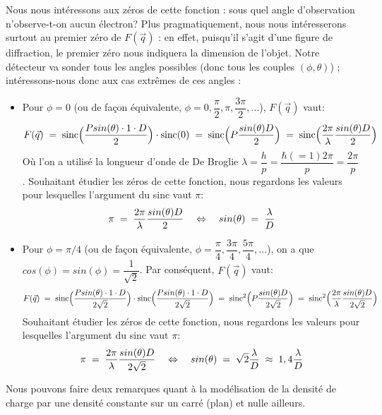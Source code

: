 Nous nous intéressons aux zéros de cette fonction : sous quel angle d'observation n'observe-t-on aucun électron? Plus pragmatiquement, nous nous intéresserons surtout au premier zéro de $F(\vec{q})$ : en effet, puisqu'il s'agit d'une figure de diffraction, le premier zéro nous indiquera la dimension de l'objet. Notre détecteur va sonder tous les angles possibles (donc tous les couples $(\phi,\theta)$) ; intéressons-nous donc aux cas extrêmes de ces angles : 
\begin{itemize}[label=$\bullet$]
    
    \item Pour $\phi=0$ (ou de façon équivalente, $\phi=0,\dfrac{\pi}{2},\pi,\dfrac{3\pi}{2},...$), $F(\vec{q})$ vaut:
    \begin{equation*}
        F(\vec{q})  \; = \; \text{sinc}\Big(\dfrac{P sin(\theta)\cdot 1 \cdot D}{2}\Big)\cdot \text{sinc}(0) 
        \; = \; \text{sinc}\Big(P\dfrac{sin(\theta)D}{2}\Big)
        \; = \; \text{sinc}\Big(\dfrac{2\pi}{\lambda}\dfrac{sin(\theta)D}{2}\Big)
    \end{equation*}
    Où l'on a utilisé la longueur d'onde de De Broglie $\lambda = \dfrac{h}{p} = \dfrac{\hbar(=1) 2\pi}{p} = \dfrac{2\pi}{p}$. Souhaitant étudier les zéros de cette fonction, nous regardons les valeurs pour lesquelles l'argument du sinc vaut $\pi$:
    \begin{equation*}
        \pi 
        \; = \; \dfrac{2\pi}{\lambda}\dfrac{sin(\theta)D}{2}
        \quad \Leftrightarrow \quad
        sin(\theta) \; = \; \dfrac{\lambda}{D}
    \end{equation*}
    
    \item Pour $\phi=\pi/4$ (ou de façon équivalente, $\phi=\dfrac{\pi}{4},\dfrac{3\pi}{4},\dfrac{5\pi}{4},...$), on a que $cos(\phi)=sin(\phi)=\dfrac{1}{\sqrt{2}}$. Par conséquent, $F(\vec{q})$ vaut:
    \begin{equation*}
        F(\vec{q})  \; = \; 
        \text{sinc}\Big(\dfrac{P sin(\theta)\cdot 1 \cdot D}{2\sqrt{2}}\Big)
        \cdot 
        \text{sinc}\Big(\dfrac{P sin(\theta)\cdot 1 \cdot D}{2\sqrt{2}}\Big)
        \; = \; \text{sinc}^2 \Big(P \dfrac{sin(\theta)D}{2\sqrt{2}}\Big)
        \; = \; \text{sinc}^2 \Big(\dfrac{2\pi}{\lambda}\dfrac{sin(\theta)D}{2\sqrt{2}}\Big)
    \end{equation*}
    Souhaitant étudier les zéros de cette fonction, nous regardons les valeurs pour lesquelles l'argument du sinc vaut $\pi$:
    \begin{equation*}
        \pi 
        \; = \; \dfrac{2\pi}{\lambda}\dfrac{sin(\theta)D}{2\sqrt{2}}
        \quad \Leftrightarrow \quad
        sin(\theta) \; = \; \sqrt{2}\dfrac{\lambda}{D} \;\approx\; 1,4\dfrac{\lambda}{D}
    \end{equation*}
\end{itemize}
Nous pouvons faire deux remarques quant à la modélisation de la densité de charge par une densité constante sur un carré (plan) et nulle ailleurs.



